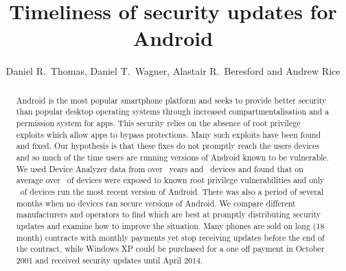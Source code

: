\documentclass[conference,a4paper,twoside]{IEEEtran}
\author{Daniel R.\ Thomas, Daniel T.\ Wagner, Alastair R.\ Beresford and Andrew Rice}
\begin{document}
\title{Timeliness of security updates for Android}


\author{
}


\maketitle


\begin{abstract}
Android is the most popular smartphone platform and seeks to provide better security than popular desktop operating systems through increased compartmentalisation and a permission system for apps.
This security relies on the absence of root privilege exploits which allow apps to bypass protections.
Many such exploits have been found and fixed.
Our hypothesis is that these fixes do not promptly reach the users devices and so much of the time users are running versions of Android known to be vulnerable.
We used Device Analyzer data from over \daOSYearsOfData\ years and \daNumOSDevices\ devices and found that on average over \daMeanInsecurityPerc\ of devices were exposed to known root privilege vulnerabilities and only \daUpdatednessPerc\ of devices run the most recent version of Android.
There was also a period of several months when no devices ran secure versions of Android.
We compare different manufacturers and operators to find which are best at promptly distributing security updates and examine how to improve the situation. %
Many phones are sold on long (18 month) contracts with monthly payments yet stop receiving updates before the end of the contract, while Windows XP could be purchased for a one off payment in October 2001 and received security updates until April 2014.
\end{abstract}
\end{document}
